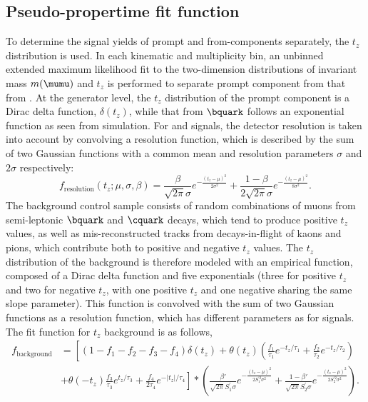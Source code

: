 \subsection{Pseudo-propertime fit function}
To determine the signal yields of prompt and from-\bquark components separately, the $t_z$ distribution is used. In each kinematic and multiplicity bin, an unbinned extended maximum likelihood fit to the two-dimension distributions of invariant mass $m(\mumu)$ and $t_z$ is performed to separate prompt component from that from \bquark.
At the generator level, the $t_z$ distribution of the prompt component is a Dirac delta function, $\delta(t_z)$, while that from $\bquark$ follows an exponential function as seen from simulation. For \jpsi and \psitwos signals, the detector resolution is taken into account by convolving a resolution function, which is described by the sum of two Gaussian functions with a common mean and resolution parameters $\sigma$ and $2\sigma$ respectively:
\begin{equation}
f_\mathrm{resolution}(t_z;\mu,\sigma,\beta) = \frac{\beta}{\sqrt{2\pi}\sigma} e^{-\frac{(t_z-\mu)^2}{2\sigma^2}}
+\frac{1-\beta}{2\sqrt{2\pi}\sigma} e^{-\frac{(t_z-\mu)^2}{8\sigma^2}}.
\end{equation}
The background control sample consists of random combinations of muons from semi-leptonic $\bquark$ and $\cquark$ decays, which tend to produce positive $t_z$ values, as well as mis-reconstructed tracks from decays-in-flight of kaons and pions, which contribute both to positive and negative $t_z$ values. The $t_z$ distribution of the background is therefore modeled with an empirical function, composed of a Dirac delta function and five exponentials (three for positive $t_z$ and two for negative $t_z$, with one positive $t_z$ and one negative sharing the same slope parameter). This function is convolved with the sum of two Gaussian functions as a resolution function, which has different parameters as for signals. The fit function for $t_z$ background is as follows,
\begin{align}
f_\mathrm{background} &=
\left[(1-f_1-f_2-f_3-f_4)\delta(t_z)+\theta(t_z)(\frac{f_1}{\tau_1}e^{-t_z/\tau_1}+\frac{f_2}{\tau_2}e^{-t_z/\tau_2})\right.
\nonumber\\
&\left. +\theta(-t_z)\frac{f_3}{\tau_3}e^{t_z/\tau_3}+\frac{f_4}{2\tau_4}e^{-|t_z|/\tau_4}
\right]\ast \left(\frac{\beta'}{\sqrt{2\pi}S^{'}_1\sigma} e^{-\frac{(t_z-\mu)^2}{2S^{'2}_1\sigma^2}}
  +\frac{1-\beta'}{\sqrt{2\pi}S^{'}_2\sigma} e^{-\frac{(t_z-\mu)^2}{2S^{'2}_2\sigma^2}}\right).
\label{eq:TzBKG}
\end{align}
